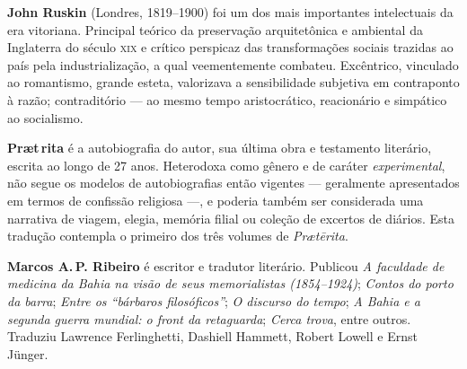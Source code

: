 \textbf{John Ruskin} (Londres, 1819--1900) foi um dos mais importantes intelectuais da era vitoriana. Principal teórico da preservação arquitetônica e ambiental da Inglaterra do século \textsc{xix} e crítico perspicaz das transformações sociais trazidas ao país pela industrialização, a qual veementemente combateu. Excêntrico, vinculado ao romantismo, grande esteta, valorizava a sensibilidade subjetiva em contraponto à razão; contraditório --- ao mesmo tempo aristocrático, reacionário e simpático ao socialismo.

\textbf{Pr\ae t\,rita} é a autobiografia do autor, sua última obra e testamento literário, escrita ao longo de 27 anos. Heterodoxa como gênero e de caráter \textit{experimental}, não segue os modelos de autobiografias então vigentes --- geralmente apresentados em termos de confissão religiosa ---, e poderia também ser considerada uma narrativa de viagem, elegia, memória filial ou coleção de excertos de diários. Esta tradução contempla o primeiro dos três volumes de \textit{Pr\ae tērita}.

\textbf{Marcos A.\,P. Ribeiro} é escritor e tradutor literário. Publicou \textit{A faculdade de medicina da Bahia na visão de seus memorialistas (1854--1924)}; \textit{Contos do porto da barra}; \textit{Entre os ``bárbaros filosóficos''}; \textit{O discurso do tempo}; \textit{A Bahia e a segunda guerra mundial: o front da retaguarda}; \textit{Cerca trova}, entre outros. Traduziu Lawrence Ferlinghetti, Dashiell Hammett, Robert Lowell e Ernst Jünger.






